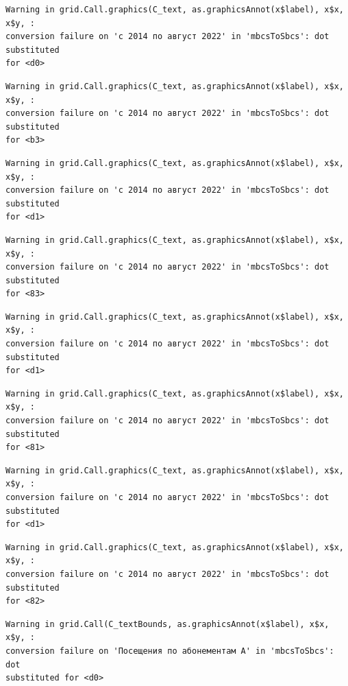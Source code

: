 \documentclass[
  letterpaper,
  DIV=11,
  numbers=noendperiod]{scrartcl}
\begin{document}
\begin{verbatim}
Warning in grid.Call.graphics(C_text, as.graphicsAnnot(x$label), x$x, x$y, :
conversion failure on 'с 2014 по август 2022' in 'mbcsToSbcs': dot substituted
for <d0>
\end{verbatim}

\begin{verbatim}
Warning in grid.Call.graphics(C_text, as.graphicsAnnot(x$label), x$x, x$y, :
conversion failure on 'с 2014 по август 2022' in 'mbcsToSbcs': dot substituted
for <b3>
\end{verbatim}

\begin{verbatim}
Warning in grid.Call.graphics(C_text, as.graphicsAnnot(x$label), x$x, x$y, :
conversion failure on 'с 2014 по август 2022' in 'mbcsToSbcs': dot substituted
for <d1>
\end{verbatim}

\begin{verbatim}
Warning in grid.Call.graphics(C_text, as.graphicsAnnot(x$label), x$x, x$y, :
conversion failure on 'с 2014 по август 2022' in 'mbcsToSbcs': dot substituted
for <83>
\end{verbatim}

\begin{verbatim}
Warning in grid.Call.graphics(C_text, as.graphicsAnnot(x$label), x$x, x$y, :
conversion failure on 'с 2014 по август 2022' in 'mbcsToSbcs': dot substituted
for <d1>
\end{verbatim}

\begin{verbatim}
Warning in grid.Call.graphics(C_text, as.graphicsAnnot(x$label), x$x, x$y, :
conversion failure on 'с 2014 по август 2022' in 'mbcsToSbcs': dot substituted
for <81>
\end{verbatim}

\begin{verbatim}
Warning in grid.Call.graphics(C_text, as.graphicsAnnot(x$label), x$x, x$y, :
conversion failure on 'с 2014 по август 2022' in 'mbcsToSbcs': dot substituted
for <d1>
\end{verbatim}

\begin{verbatim}
Warning in grid.Call.graphics(C_text, as.graphicsAnnot(x$label), x$x, x$y, :
conversion failure on 'с 2014 по август 2022' in 'mbcsToSbcs': dot substituted
for <82>
\end{verbatim}

\begin{verbatim}
Warning in grid.Call(C_textBounds, as.graphicsAnnot(x$label), x$x, x$y, :
conversion failure on 'Посещения по абонементам А' in 'mbcsToSbcs': dot
substituted for <d0>
\end{verbatim}
\end{document}
